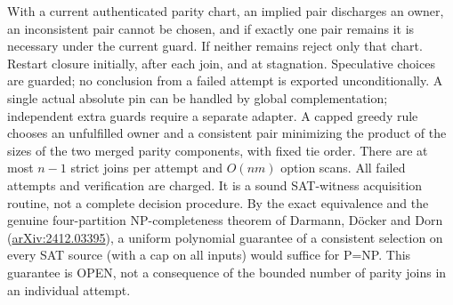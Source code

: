 \documentclass[11pt]{article}
\begin{document}
With a current authenticated parity chart, an implied pair discharges an owner, an inconsistent pair cannot be chosen, and if exactly one pair remains it is necessary under the current guard. If neither remains reject only that chart. Restart closure initially, after each join, and at stagnation. Speculative choices are guarded; no conclusion from a failed attempt is exported unconditionally. A single actual absolute pin can be handled by global complementation; independent extra guards require a separate adapter. A capped greedy rule chooses an unfulfilled owner and a consistent pair minimizing the product of the sizes of the two merged parity components, with fixed tie order. There are at most $n-1$ strict joins per attempt and $O(nm)$ option scans. All failed attempts and verification are charged. It is a sound SAT-witness acquisition routine, not a complete decision procedure. By the exact equivalence and the genuine four-partition NP-completeness theorem of Darmann, D\"ocker and Dorn (\href{https://arxiv.org/abs/2412.03395}{arXiv:2412.03395}), a uniform polynomial guarantee of a consistent selection on every SAT source (with a cap on all inputs) would suffice for P=NP. This guarantee is OPEN, not a consequence of the bounded number of parity joins in an individual attempt.
\end{document}
